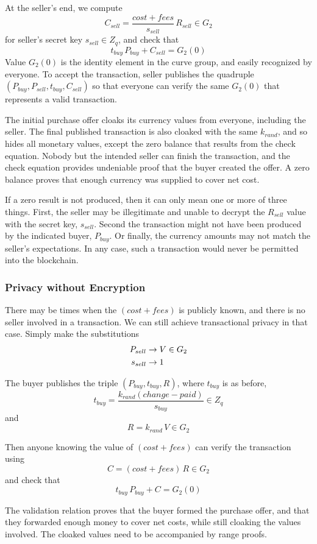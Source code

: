\documentclass{yellowpaper}
\begin{document}
At the seller's end, we compute
$$C_{sell} = \frac{cost + fees}{s_{sell}} \, R_{sell} \in G_2$$
for seller's secret key $s_{sell} \in Z_q$, and check that
$$t_{buy}\, P_{buy} + C_{sell} = G_2(0)$$
Value $G_2(0)$ is the identity element in the curve group, and easily  recognized by everyone. To accept the transaction, seller publishes the quadruple $(P_{buy}, P_{sell}, t_{buy}, C_{sell})$ so that everyone can verify the same $G_2(0)$ that represents a valid transaction.

The initial purchase offer cloaks its currency values from everyone, including the seller. The final published transaction is also cloaked with the same $k_{rand}$, and so hides all monetary values, except the zero balance that results from the check equation. Nobody but the intended seller can finish the transaction, and the check equation provides undeniable proof that the buyer created the offer. A zero balance proves that enough currency was supplied to cover net cost.

If a zero result is not produced, then it can only mean one or more of three things. First, the seller may be illegitimate and unable to decrypt the $R_{sell}$ value with the secret key, $s_{sell}$. Second the transaction might not have been produced by the indicated buyer, $P_{buy}$. Or finally, the currency amounts may not match the seller's expectations. In any case, such a transaction would never be permitted into the blockchain.
\subsubsection{Privacy without Encryption}
There may be times when the $(cost + fees)$ is publicly known, and there is no seller involved in a transaction. We can still achieve transactional privacy in that case. Simply make the substitutions
\begin{align}
P_{sell} &\to V \in G_2 \notag \\
s_{sell} &\to 1 \notag
\end{align}

The buyer publishes the triple $(P_{buy}, t_{buy}, R)$, where $t_{buy}$ is as before,
$$t_{buy} = \frac{k_{rand} (change - paid)}{s_{buy}} \in Z_q$$
and
$$R = k_{rand}\, V \in G_2$$

Then anyone knowing the value of $(cost + fees)$ can verify the transaction using
$$C = (cost + fees) \, R \in G_2$$
and check that
$$t_{buy}\, P_{buy} + C = G_2(0)$$

The validation relation proves that the buyer formed the purchase offer, and that they forwarded enough money to cover net costs, while still cloaking the values involved. The cloaked values need to be accompanied by range proofs.
\end{document}
